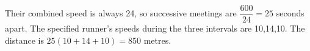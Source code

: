 Their combined speed is always 24, so successive meetings are $\dfrac{600}{24}=25$ seconds apart. The specified runner's speeds during the three intervals are 10,14,10. The distance is $25(10+14+10)=\boxed{850}$ metres.
